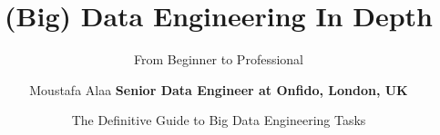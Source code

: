 \title[Data Engineering In Depth] %
{(Big) Data Engineering In Depth}

\subtitle{From Beginner to Professional}


\author[Moustafa Alaa] {
	Moustafa Alaa \newline 	\newline
	\footnotesize \textcolor{offpurple}{\textbf{Senior Data Engineer at Onfido, London, UK}} \newline
}


\date[\today] %
{The Definitive Guide to Big Data Engineering Tasks}




